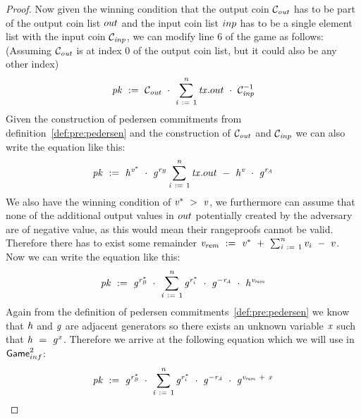 \begin{proof}
    Now given the winning condition that the output coin $\mathcal{C}_{\mathit{out}}$ has to be part of the output coin list $out$ and the input coin list $inp$ has to be a single element list with the input coin $\mathcal{C}_{\mathit{inp}}$, we can modify line 6 of the game as follows: (Assuming $\mathcal{C}_{\mathit{out}}$ is at index 0 of the output coin list, but it could also be any other index)
    \[ \mathit{pk} ~:=~ \mathcal{C}_{\mathit{out}} ~\cdot~ \sum_{\mathit{i} ~:=~ 1}^{\mathit{n}} \mathit{tx}.out ~\cdot~ \mathcal{C}_{\mathit{inp}}^{-1} \]
    Given the construction of pedersen commitments from definition~\ref{def:pre:pedersen} and the construction of $\mathcal{C}_{\mathit{out}}$ and $\mathcal{C}_{\mathit{inp}}$ we can also write the equation like this:
    \[ \mathit{pk} ~:=~ \mathit{h}^{\mathit{v}^*} ~\cdot~ \mathit{g}^{\mathit{r}_{\mathit{B}}} \sum_{\mathit{i} ~:=~ 1}^{\mathit{n}} \mathit{tx}.out ~-~ \mathit{h}^{\mathit{v}} ~\cdot~ \mathit{g}^{\mathit{r}_{\mathit{A}}} \]
    We also have the winning condition of $\mathit{v}^* ~>~ \mathit{v}$, we furthermore can assume that none of the additional output values in $out$ potentially created by the adversary are of negative value, as this would mean their rangeproofs cannot be valid.
    Therefore there has to exist some remainder $\mathit{v_{rem}} ~:=~ \mathit{v}^* ~+~ \sum_{\mathit{i} ~:=~ 1}^{\mathit{n}} v_i ~-~ v$.
    Now we can write the equation like this:
    \[  \mathit{pk} ~:=~ \mathit{g}^{\mathit{r}_{\mathit{B}}^*} ~\cdot~ \sum_{\mathit{i} ~:=~ 1}^{\mathit{n}} \mathit{g}^{\mathit{r}_i^*} ~\cdot~ \mathit{g}^{- \mathit{r}_{\mathit{A}}} ~\cdot~ \mathit{h}^{\mathit{v_{rem}}} \]
    Again from the definition of pedersen commitments~\ref{def:pre:pedersen} we know that $\mathit{h}$ and $\mathit{g}$ are adjacent generators so there exists an unknown variable $\mathit{x}$ such that $\mathit{h} ~=~ \mathit{g}^{x}$.
    Therefore we arrive at the following equation which we will use in $\mathsf{Game}_{inf}^{2}$:
    \[  \mathit{pk} ~:=~ \mathit{g}^{\mathit{r}_{\mathit{B}}^*} ~\cdot~ \sum_{\mathit{i} ~:=~ 1}^{\mathit{n}} \mathit{g}^{\mathit{r}_i^*} ~\cdot~ \mathit{g}^{- \mathit{r}_{\mathit{A}}} ~\cdot~ \mathit{g}^{\mathit{v_{rem}} ~+~ \mathit{x}} \]


\end{proof}
